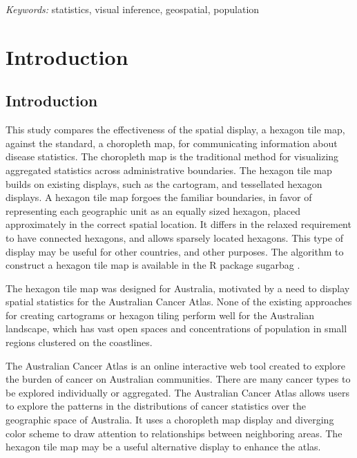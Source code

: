 \documentclass[12pt]{article}
\begin{document}
\noindent%
{\it Keywords:} statistics, visual inference, geospatial, population
\vfill

\newpage
{} %

\section{Introduction}
\label{sec:intro}

\subsection{Introduction}
\label{sec:int}

This study compares the effectiveness of the spatial display, a hexagon
tile map, against the standard, a choropleth map, for communicating
information about disease statistics. The choropleth map is the
traditional method for visualizing aggregated statistics across
administrative boundaries. The hexagon tile map builds on existing
displays, such as the cartogram, and tessellated hexagon displays. A
hexagon tile map forgoes the familiar boundaries, in favor of
representing each geographic unit as an equally sized hexagon, placed
approximately in the correct spatial location. It differs in the relaxed
requirement to have connected hexagons, and allows sparsely located
hexagons. This type of display may be useful for other countries, and
other purposes. The algorithm to construct a hexagon tile map is
available in the R package sugarbag \citep{sugarbag}.

The hexagon tile map was designed for Australia, motivated by a need to
display spatial statistics for the Australian Cancer Atlas. None of the
existing approaches for creating cartograms or hexagon tiling perform
well for the Australian landscape, which has vast open spaces and
concentrations of population in small regions clustered on the
coastlines.

The Australian Cancer Atlas \citep{atlas} is an online interactive web
tool created to explore the burden of cancer on Australian communities.
There are many cancer types to be explored individually or aggregated.
The Australian Cancer Atlas allows users to explore the patterns in the
distributions of cancer statistics over the geographic space of
Australia. It uses a choropleth map display and diverging color scheme
to draw attention to relationships between neighboring areas. The
hexagon tile map may be a useful alternative display to enhance the
atlas.
\end{document}
